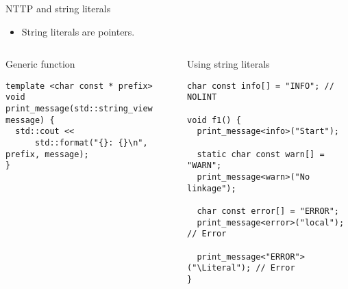 \begin{frame}[t,fragile]{NTTP and string literals}
\begin{itemize}
  \item String literals are pointers.
\end{itemize}

\begin{columns}[T]

\begin{block}{Generic function}
\begin{lstlisting}
template <char const * prefix>
void print_message(std::string_view message) {
  std::cout << 
      std::format("{}: {}\n", prefix, message);
}

\end{lstlisting}
\end{block}

\pause
{}
\begin{block}{Using string literals}
\begin{lstlisting}
char const info[] = "INFO"; // NOLINT

void f1() {
  print_message<info>("Start");

  static char const warn[] = "WARN";
  print_message<warn>("No linkage");

  char const error[] = "ERROR";
  print_message<error>("local"); // Error

  print_message<"ERROR">("\Literal"); // Error
}
\end{lstlisting}
\end{block}

\end{columns}
\end{frame}

